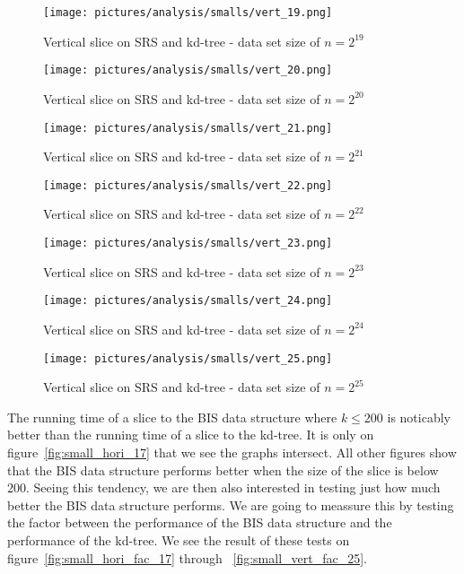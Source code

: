 \begin{figure}[h]
    \centering
    \texttt{[image: pictures/analysis/smalls/vert\_19.png]}
    \caption{Vertical slice on SRS and kd-tree - data set size of $n=2^{19}$}\label{fig:small_vert_19}
\end{figure}

\begin{figure}[h]
    \centering
    \texttt{[image: pictures/analysis/smalls/vert\_20.png]}
    \caption{Vertical slice on SRS and kd-tree - data set size of $n=2^{20}$}\label{fig:small_vert_20}
\end{figure}

\begin{figure}[h]
    \centering
    \texttt{[image: pictures/analysis/smalls/vert\_21.png]}
    \caption{Vertical slice on SRS and kd-tree - data set size of $n=2^{21}$}\label{fig:small_vert_21}
\end{figure}

\begin{figure}[h]
    \centering
    \texttt{[image: pictures/analysis/smalls/vert\_22.png]}
    \caption{Vertical slice on SRS and kd-tree - data set size of $n=2^{22}$}\label{fig:small_vert_22}
\end{figure}

\begin{figure}[h]
    \centering
    \texttt{[image: pictures/analysis/smalls/vert\_23.png]}
    \caption{Vertical slice on SRS and kd-tree - data set size of $n=2^{23}$}\label{fig:small_vert_23}
\end{figure}

\begin{figure}[h]
    \centering
    \texttt{[image: pictures/analysis/smalls/vert\_24.png]}
    \caption{Vertical slice on SRS and kd-tree - data set size of $n=2^{24}$}\label{fig:small_vert_24}
\end{figure}

\begin{figure}[h]
    \centering
    \texttt{[image: pictures/analysis/smalls/vert\_25.png]}
    \caption{Vertical slice on SRS and kd-tree - data set size of $n=2^{25}$}\label{fig:small_vert_25}
\end{figure}

The running time of a slice to the BIS data structure where $k \leq 200$ is noticably better than the running time of a slice to the kd-tree. It is only on figure~\ref{fig:small_hori_17} that we see the graphs intersect. All other figures show that the BIS data structure performs better when the size of the slice is below $200$. Seeing this tendency, we are then also interested in testing just how much better the BIS data structure performs. We are going to meassure this by testing the factor between the performance of the BIS data structure and the performance of the kd-tree. We see the result of these tests on figure~\ref{fig:small_hori_fac_17} through ~\ref{fig:small_vert_fac_25}.

